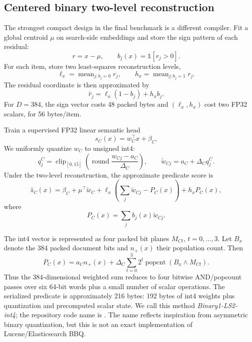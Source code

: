 \subsection{Centered binary two-level reconstruction}
The strongest compact design in the final benchmark is a different compiler. Fit a global centroid $\mu$ on search-side embeddings and store the sign pattern of each residual:
\begin{equation}
r=x-\mu,\qquad b_j(x)=\mathbb{1}[r_j>0].
\end{equation}
For each item, store two least-squares reconstruction levels,
\begin{equation}
\ell_x=\operatorname{mean}_{j:b_j=0} r_j,\qquad
h_x=\operatorname{mean}_{j:b_j=1} r_j.
\label{eq:ls2}
\end{equation}
The residual coordinate is then approximated by
\begin{equation}
\widehat r_j=\ell_x(1-b_j)+h_x b_j .
\end{equation}
For $D=384$, the sign vector costs 48 packed bytes and $(\ell_x,h_x)$ cost two FP32 scalars, for 56 bytes/item.

Train a supervised FP32 linear semantic head
\begin{equation}
s_C(x)=w_C^\top x+\beta_C .
\end{equation}
We uniformly quantize $w_C$ to unsigned int4:
\begin{equation}
q_j^C=\operatorname{clip}_{[0,15]}
\left(\operatorname{round}\frac{w_{Cj}-a_C}{\Delta_C}\right),
\qquad
\widetilde w_{Cj}=a_C+\Delta_C q_j^C .
\end{equation}
Under the two-level reconstruction, the approximate predicate score is
\begin{equation}
\widehat s_C(x)=
\beta_C+\mu^\top\widetilde w_C
+\ell_x\left(\sum_j\widetilde w_{Cj}-P_C(x)\right)
+h_x P_C(x),
\label{eq:binary_score}
\end{equation}
where
\begin{equation}
P_C(x)=\sum_j b_j(x)\widetilde w_{Cj}.
\end{equation}

The int4 vector is represented as four packed bit planes $M_{Ct}$, $t=0,\ldots,3$. Let $B_x$ denote the 384 packed document bits and $n_+(x)$ their population count. Then
\begin{equation}
P_C(x)=
a_C n_+(x)
+\Delta_C\sum_{t=0}^{3}2^t
\operatorname{popcnt}(B_x\wedge M_{Ct}).
\label{eq:popcount}
\end{equation}
Thus the 384-dimensional weighted sum reduces to four bitwise AND/popcount passes over six 64-bit words plus a small number of scalar operations. The serialized predicate is approximately 216 bytes: 192 bytes of int4 weights plus quantization and precomputed scalar state. We call this method \emph{Binary1-LS2-int4}; the repository code name is . The name reflects inspiration from asymmetric binary quantization, but this is not an exact implementation of Lucene/Elasticsearch BBQ.

